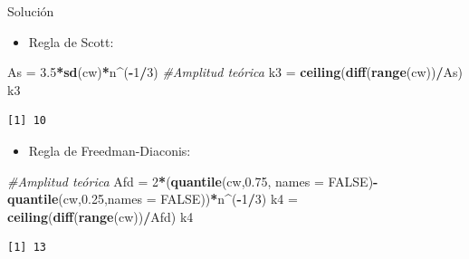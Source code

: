 \documentclass[
  ignorenonframetext,
  aspectratio=169]{beamer}
\newenvironment{Shaded}{\begin{snugshade}}{\end{snugshade}}
\newcommand{\AttributeTok}[1]{\textcolor[rgb]{0.13,0.29,0.53}{#1}}
\newcommand{\CommentTok}[1]{\textcolor[rgb]{0.56,0.35,0.01}{\textit{#1}}}
\newcommand{\ConstantTok}[1]{\textcolor[rgb]{0.56,0.35,0.01}{#1}}
\newcommand{\DecValTok}[1]{\textcolor[rgb]{0.00,0.00,0.81}{#1}}
\newcommand{\FloatTok}[1]{\textcolor[rgb]{0.00,0.00,0.81}{#1}}
\newcommand{\FunctionTok}[1]{\textcolor[rgb]{0.13,0.29,0.53}{\textbf{#1}}}
\newcommand{\NormalTok}[1]{#1}
\newcommand{\OtherTok}[1]{\textcolor[rgb]{0.56,0.35,0.01}{#1}}
\newcommand{\SpecialCharTok}[1]{\textcolor[rgb]{0.81,0.36,0.00}{\textbf{#1}}}
\providecommand{\tightlist}{%
  \setlength{\itemsep}{0pt}\setlength{\parskip}{0pt}}
\begin{document}
\begin{frame}[fragile]{Solución}
\label{soluciuxf3n-2}
\begin{itemize}
\tightlist
\item
  Regla de Scott:
\end{itemize}

\begin{Shaded}
\begin{Highlighting}[]
\NormalTok{As }\OtherTok{=} \FloatTok{3.5}\SpecialCharTok{*}\FunctionTok{sd}\NormalTok{(cw)}\SpecialCharTok{*}\NormalTok{n}\SpecialCharTok{\^{}}\NormalTok{(}\SpecialCharTok{{-}}\DecValTok{1}\SpecialCharTok{/}\DecValTok{3}\NormalTok{) }\CommentTok{\#Amplitud teórica}
\NormalTok{k3 }\OtherTok{=} \FunctionTok{ceiling}\NormalTok{(}\FunctionTok{diff}\NormalTok{(}\FunctionTok{range}\NormalTok{(cw))}\SpecialCharTok{/}\NormalTok{As)}
\NormalTok{k3}
\end{Highlighting}
\end{Shaded}

\begin{verbatim}
[1] 10
\end{verbatim}

\begin{itemize}
\tightlist
\item
  Regla de Freedman-Diaconis:
\end{itemize}

\begin{Shaded}
\begin{Highlighting}[]
\CommentTok{\#Amplitud teórica}
\NormalTok{Afd }\OtherTok{=} \DecValTok{2}\SpecialCharTok{*}\NormalTok{(}\FunctionTok{quantile}\NormalTok{(cw,}\FloatTok{0.75}\NormalTok{, }\AttributeTok{names =} \ConstantTok{FALSE}\NormalTok{)}\SpecialCharTok{{-}}
           \FunctionTok{quantile}\NormalTok{(cw,}\FloatTok{0.25}\NormalTok{,}\AttributeTok{names =} \ConstantTok{FALSE}\NormalTok{))}\SpecialCharTok{*}\NormalTok{n}\SpecialCharTok{\^{}}\NormalTok{(}\SpecialCharTok{{-}}\DecValTok{1}\SpecialCharTok{/}\DecValTok{3}\NormalTok{) }
\NormalTok{k4 }\OtherTok{=} \FunctionTok{ceiling}\NormalTok{(}\FunctionTok{diff}\NormalTok{(}\FunctionTok{range}\NormalTok{(cw))}\SpecialCharTok{/}\NormalTok{Afd)}
\NormalTok{k4}
\end{Highlighting}
\end{Shaded}

\begin{verbatim}
[1] 13
\end{verbatim}
\end{frame}
\end{document}
